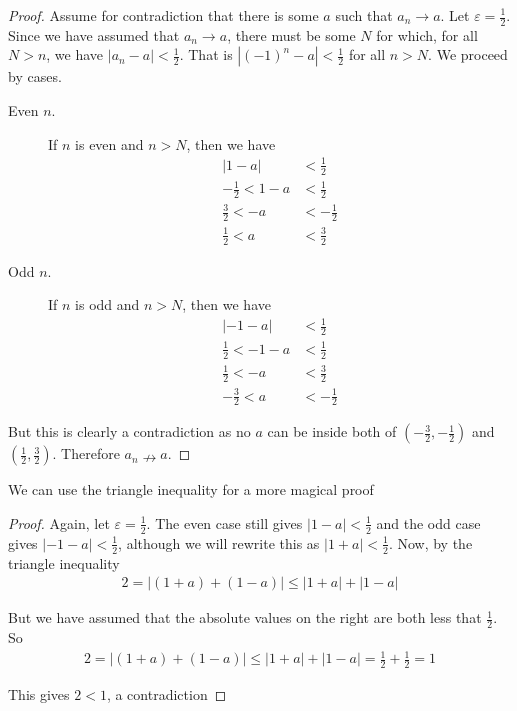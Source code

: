 \documentclass{article}
\begin{document}
\begin{proof}
	Assume for contradiction that there is some $a$ such that $a_n \rightarrow a$. Let $\varepsilon = \tfrac{1}{2}$. Since we have assumed that
	$a_n \rightarrow a$, there must be some $N$ for which, for all $N > n$, we have $|a_n - a| < \frac{1}{2}$. That is $|(-1)^n - a| < \frac{1}{2}$ for all $n > N$.
	We proceed by cases.

	\begin{description}
		\item[Even $n$.]
		      If $n$ is even and $n > N$, then we have
		      \begin{align*}
			      \left\lvert1 - a\right\rvert & < \frac{1}{2}  \\
			      -\frac{1}{2} < 1 - a         & < \frac{1}{2}  \\
			      \frac{3}{2} < -a             & < -\frac{1}{2} \\
			      \frac {1}{2} < a             & < \frac{3}{2}
		      \end{align*}
		\item[Odd $n$.]
		      If $n$ is odd and $n > N$, then we have
		      \begin{align*}
			      \left\lvert-1 - a\right\rvert & < \frac{1}{2}  \\
			      \frac{1}{2} < -1 -a           & < \frac{1}{2}  \\
			      \frac{1}{2} < -a              & < \frac{3}{2}  \\
			      -\frac{3}{2} < a              & < -\frac{1}{2}
		      \end{align*}
	\end{description}

	But this is clearly a contradiction as no $a$ can be inside both of $(-\frac{3}{2}, -\frac{1}{2})$ and $(\frac{1}{2}, \frac{3}{2})$.
	Therefore $a_n \nrightarrow a$.
\end{proof}

We can use the triangle inequality for a more magical proof
\begin{proof}
	Again, let $\varepsilon = \frac{1}{2}$. The even case still gives $\left\lvert1 - a\right\rvert < \frac{1}{2}$ and the odd case
	gives $\left\lvert-1 - a\right\rvert < \frac{1}{2}$, although we will rewrite this as $\left\lvert1 + a\right\rvert < \frac{1}{2}$.
	Now, by the triangle inequality
	\begin{align*}
		2 = \left\lvert(1 + a) + (1 - a)\right\rvert \le |1 + a| + |1 - a|
	\end{align*}

	But we have assumed that the absolute values on the right are both less that $\frac{1}{2}$. So
	\begin{align*}
		2 = \left\lvert(1 + a) + (1 - a)\right\rvert \le |1 + a| + |1 - a| = \frac{1}{2} + \frac{1}{2} = 1
	\end{align*}

	This gives $2 < 1$, a contradiction
\end{proof}
\end{document}
